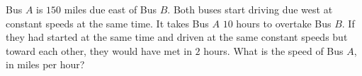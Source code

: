 Bus $A$ is $150$ miles due east of Bus $B$. Both buses start driving due west at constant speeds at the same time. It takes Bus $A$ $10$ hours to overtake Bus $B$. If they had started at the same time and driven at the same constant speeds but toward each other, they would have met in $2$ hours. What is the speed of Bus $A$, in miles per hour?
